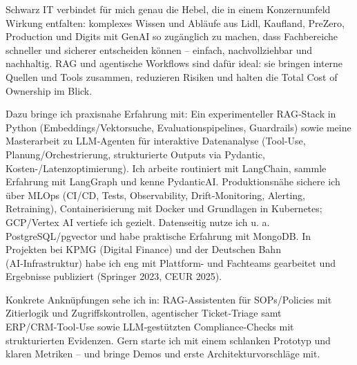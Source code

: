 Schwarz IT verbindet für mich genau die Hebel, die in einem Konzernumfeld Wirkung entfalten: komplexes Wissen und Abläufe aus Lidl, Kaufland, PreZero, Production und Digits mit GenAI so zugänglich zu machen, dass Fachbereiche schneller und sicherer entscheiden können – einfach, nachvollziehbar und nachhaltig. RAG und agentische Workflows sind dafür ideal: sie bringen interne Quellen und Tools zusammen, reduzieren Risiken und halten die Total Cost of Ownership im Blick.

Dazu bringe ich praxisnahe Erfahrung mit: Ein experimenteller RAG‑Stack in Python (Embeddings/Vektorsuche, Evaluationspipelines, Guardrails) sowie meine Masterarbeit zu LLM‑Agenten für interaktive Datenanalyse (Tool‑Use, Planung/Orchestrierung, strukturierte Outputs via Pydantic, Kosten-/Latenzoptimierung). Ich arbeite routiniert mit LangChain, sammle Erfahrung mit LangGraph und kenne PydanticAI. Produktionsnähe sichere ich über MLOps (CI/CD, Tests, Observability, Drift‑Monitoring, Alerting, Retraining), Containerisierung mit Docker und Grundlagen in Kubernetes; GCP/Vertex AI vertiefe ich gezielt. Datenseitig nutze ich u. a. PostgreSQL/pgvector und habe praktische Erfahrung mit MongoDB. In Projekten bei KPMG (Digital Finance) und der Deutschen Bahn (AI‑Infrastruktur) habe ich eng mit Plattform- und Fachteams gearbeitet und Ergebnisse publiziert (Springer 2023, CEUR 2025).

Konkrete Anknüpfungen sehe ich in: RAG‑Assistenten für SOPs/Policies mit Zitierlogik und Zugriffskontrollen, agentischer Ticket‑Triage samt ERP/CRM‑Tool‑Use sowie LLM‑gestützten Compliance‑Checks mit strukturierten Evidenzen. Gern starte ich mit einem schlanken Prototyp und klaren Metriken – und bringe Demos und erste Architekturvorschläge mit.